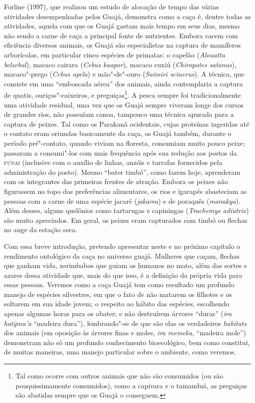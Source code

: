 Forline (1997), que realizou um estudo de alocação de tempo das várias
atividades desempenhadas pelos Guajá, demonstra como a caça é, dentre
todas as atividades, aquela com que os Guajá gastam mais tempo em seus
dias, mesmo não sendo a carne de caça a principal fonte de nutrientes.
Embora cacem com eficiência diversos animais, os Guajá são especialistas
na captura de mamíferos arborícolas, em particular cinco espécies de
primatas: o capelão (\emph{Alouatta belzebul}), macaco cairara
(\emph{Cebus kaapor}), macaco cuxiú (\emph{Chiropotes satanus}),
macaco"-prego (\emph{Cebus apela}) e mão"-de"-ouro (\emph{Saimiri
sciuerus}). A técnica, que consiste em uma ``emboscada aérea'' dos
animais, ainda contemplaria a captura de quatis, ouriços"-caixeiros, e
preguiças\footnote{Tal como ocorre com outros animais que não são
  consumidos (ou são pouquissimamente consumidos), como a capivara e o
  tamanduá, as preguiças são abatidas sempre que os Guajá o conseguem.}.
A pesca sempre foi tradicionalmente uma atividade residual, uma vez que
os Guajá sempre viveram longe dos cursos de grandes rios, não possuíam
canoa, tampouco uma técnica apurada para a captura de peixes. Tal como
os Parakanã ocidentais, cujas proteínas ingeridas até o contato eram
oriundas basicamente da caça, os Guajá também, durante o período
pré"-contato, quando viviam na floresta, consumiam muito pouco peixe;
passaram a consumi"-los com mais frequência após sua redução aos postos
da \textsc{funai} (inclusive com o auxílio de linhas, anzóis e tarrafas
fornecidos pela administração do posto). Mesmo ``bater timbó'', como
fazem hoje, aprenderam com os integrantes das primeiras frentes de
atração. Embora os peixes não figurassem no topo das preferências
alimentares, os rios e igarapés abasteciam as pessoas com a carne de uma
espécie jacaré (\emph{jakarea}) e de poraquês (\emph{manakya}). Além
desses, alguns quelônios como tartarugas e capiningas (\emph{Trachemys
adiutrix}) são muito apreciados. Em geral, os peixes eram capturados com
timbó ou flechas no auge da estação seca.

Com essa breve introdução, pretendo apresentar neste e no próximo
capítulo o rendimento ontológico da caça no universo guajá. Mulheres que
caçam, flechas que ganham vida, xerimbabos que guiam os humanos no mato,
além das sortes e azares dessa atividade que, mais do que isso, é a
definição da própria vida para essas pessoas. Veremos como a caça Guajá
tem como resultado um profundo manejo de espécies silvestres, em que o
fato de não matarem os filhotes e os soltarem em sua idade jovem; o
respeito ao hábito das espécies, escolhendo apenas algumas horas para os
abater; e não destruírem árvores ``duras'' (\emph{ira hatỹma'a}
``madeira dura''), lembrando"-se de que são elas os verdadeiros
\emph{habitats} dos animais (em oposição às árvores finas e moles,
\emph{ira memeka}, ``madeira mole'') demonstram não só um profundo
conhecimento bioecológico, bem como constitui, de muitas maneiras, uma
manejo particular sobre o ambiente, como veremos.

